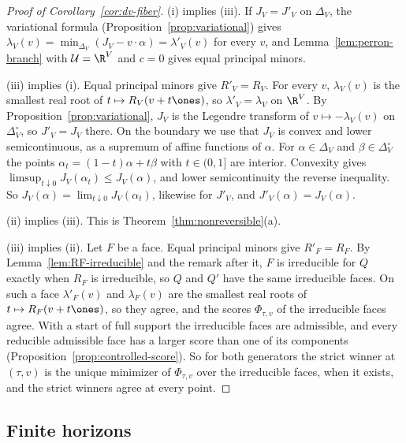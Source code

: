 \begin{proof}[Proof of Corollary~\ref{cor:dv-fiber}]
(i) implies (iii). If $J_V=J'_V$ on $\Delta_V$, the variational formula
(Proposition~\ref{prop:variational}) gives
$\lambda_V(v)=\min_{\Delta_V}(J_V-v\cdot\alpha)=\lambda'_V(v)$ for every $v$, and
Lemma~\ref{lem:perron-branch} with $\mathcal U=\R^V$ and $c=0$ gives equal principal
minors.

(iii) implies (i). Equal principal minors give $R'_V=R_V$. For every $v$,
$\lambda_V(v)$ is the smallest real root of $t\mapsto R_V(v+t\ones)$, so
$\lambda'_V=\lambda_V$ on $\R^V$. By Proposition~\ref{prop:variational}, $J_V$ is
the Legendre transform of $v\mapsto-\lambda_V(v)$ on $\Delta_V^\circ$, so
$J'_V=J_V$ there. On the boundary we use that $J_V$ is convex and lower
semicontinuous, as a supremum of affine functions of $\alpha$. For
$\alpha\in\Delta_V$ and $\beta\in\Delta_V^\circ$ the points
$\alpha_t=(1-t)\alpha+t\beta$ with $t\in(0,1]$ are interior. Convexity gives
$\limsup_{t\downarrow0}J_V(\alpha_t)\le J_V(\alpha)$, and lower semicontinuity the
reverse inequality. So $J_V(\alpha)=\lim_{t\downarrow0}J_V(\alpha_t)$, likewise
for $J'_V$, and $J'_V(\alpha)=J_V(\alpha)$.

(ii) implies (iii). This is Theorem~\ref{thm:nonreversible}(a).

(iii) implies (ii). Let $F$ be a face. Equal principal minors give $R'_F=R_F$.
By Lemma~\ref{lem:RF-irreducible} and the remark after it, $F$ is irreducible for
$Q$ exactly when $R_F$ is irreducible, so $Q$ and $Q'$ have the same irreducible
faces. On such a face $\lambda'_F(v)$ and $\lambda_F(v)$ are the smallest real
roots of $t\mapsto R_F(v+t\ones)$, so they agree, and the scores
$\Phi_{\tau,v}$ of the irreducible faces agree. With a start of full support
the irreducible faces are admissible, and every reducible admissible face has a
larger score than one of its components (Proposition~\ref{prop:controlled-score}).
So for both generators the strict winner at $(\tau,v)$ is the unique minimizer
of $\Phi_{\tau,v}$ over the irreducible faces, when it exists, and the strict
winners agree at every point.
\end{proof}

\subsection{Finite horizons}\label{sec:finite-horizon}

